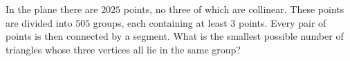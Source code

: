 In the plane there are $2025$ points, no three of which are collinear. These points are divided into $505$ groups, each containing at least $3$ points. Every pair of points is then connected by a segment. What is the smallest possible number of triangles whose three vertices all lie in the same group?
